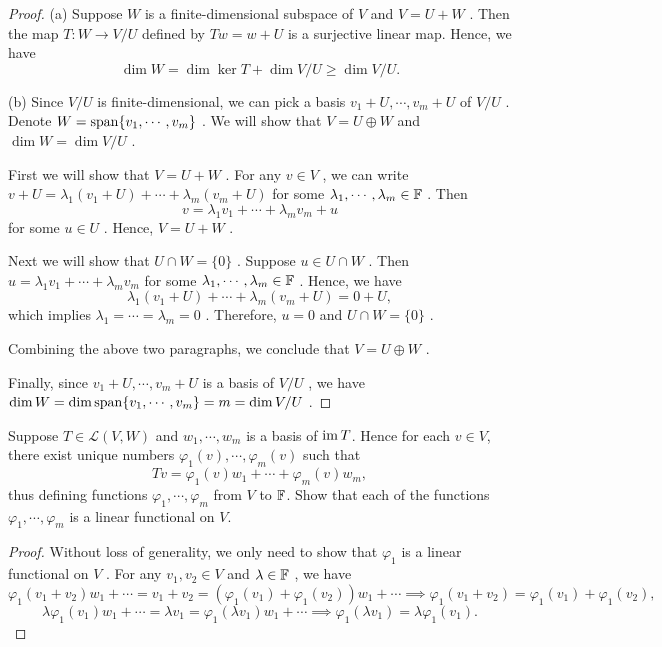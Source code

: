 \documentclass{article}
\begin{document}
\begin{proof}
	(a)  Suppose \( W \) is a finite-dimensional subspace of \( V \) and \( V = U + W \) . Then the map \( T:W\to V/U \) defined by \( Tw=w+U \) is a surjective linear map. Hence, we have
	\[ \dim W=\dim\ker T+\dim V/U\geq \dim V/U. \] \par
	(b)  Since \( V/U \) is finite-dimensional, we can pick a basis \( v_1+U, \cdots, v_m+U \) of \( V/U \) . Denote \( W=\operatorname{span}\{v_1,\cdots,v_m\} \) . We will show that \( V=U\oplus W \) and \( \dim W=\dim V/U \) .\par
	First we will show that \( V=U+W \) . For any \( v\in V \) , we can write \( v+U=\lambda_1(v_1+U)+\cdots+\lambda_m(v_m+U) \) for some \( \lambda_1,\cdots,\lambda_m\in\mathbb{F} \) . Then
	\[ v=\lambda_1v_1+\cdots+\lambda_mv_m+u \] for some \( u\in U \) . Hence, \( V=U+W \) .\par
	Next we will show that \( U\cap W=\{0\} \) . Suppose \( u\in U\cap W \) . Then \( u=\lambda_1v_1+\cdots+\lambda_mv_m \) for some \( \lambda_1,\cdots,\lambda_m\in\mathbb{F} \) . Hence, we have
	\[ \lambda_1(v_1+U)+\cdots+\lambda_m(v_m+U)=0+U, \] which implies \( \lambda_1=\cdots=\lambda_m=0 \) . Therefore, \( u=0 \) and \( U\cap W=\{0\} \) .\par
	Combining the above two paragraphs, we conclude that \( V=U\oplus W \) .\par
	Finally, since \( v_1+U, \cdots, v_m+U \) is a basis of \( V/U \) , we have \( \dim W=\dim\operatorname{span}\{v_1,\cdots,v_m\}=m=\dim V/U \) .
\end{proof}

\begin{problem}[3F-5]
	Suppose $T \in \mathcal{L}(V, W)$ and $w_1, \cdots, w_m$ is a basis of $\operatorname{im} T$. Hence for each $v \in V$, there exist unique numbers $\varphi_1(v), \cdots, \varphi_m(v)$ such that
	\[
		Tv = \varphi_1(v)w_1 + \cdots + \varphi_m(v)w_m,
	\]
	thus defining functions $\varphi_1, \cdots, \varphi_m$ from $V$ to $\mathbb{F}$. Show that each of the functions $\varphi_1, \cdots, \varphi_m$ is a linear functional on $V$.
\end{problem}

\begin{proof}
	Without loss of generality, we only need to show that \( \varphi_1 \) is a linear functional on \( V \) . For any \( v_1,v_2\in V \) and \( \lambda\in\mathbb{F} \) , we have
	\[ \varphi_1(v_1+v_2)w_1+\cdots=v_1+v_2=(\varphi_1(v_1)+\varphi_1(v_2))w_1+\cdots\implies \varphi_1(v_1+v_2)=\varphi_1(v_1)+\varphi_1(v_2), \] 
	\[ \lambda\varphi_1(v_1)w_1+\cdots=\lambda v_1=\varphi_1(\lambda v_1)w_1+\cdots\implies \varphi_1(\lambda v_1)=\lambda\varphi_1(v_1). \] 
\end{proof}
\end{document}
